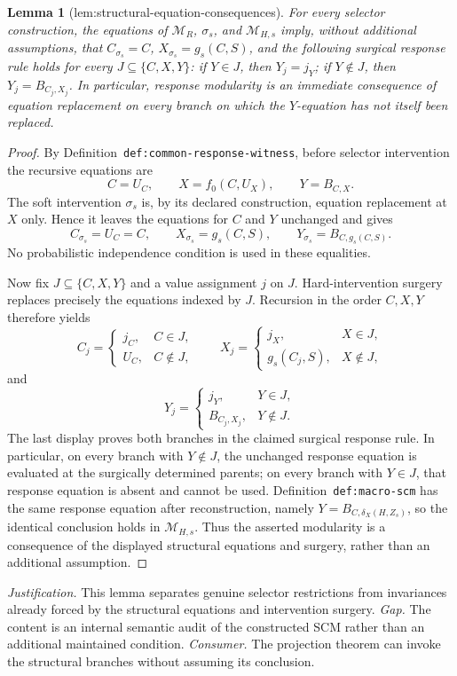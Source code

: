 \documentclass{article}
\newtheorem{lemma}{Lemma}
\begin{document}
\begin{lemma}[lem:structural-equation-consequences]\label{lem:structural-equation-consequences}
For every selector construction, the equations of \(\mathcal M_R\), \(\sigma_s\), and \(\mathcal M_{H,s}\) imply, without additional assumptions, that \(C_{\sigma_s}=C\), \(X_{\sigma_s}=g_s(C,S)\), and the following surgical response rule holds for every \(J\subseteq\{C,X,Y\}\): if \(Y\in J\), then \(Y_j=j_Y\); if \(Y\notin J\), then \(Y_j=B_{C_j,X_j}\). In particular, response modularity is an immediate consequence of equation replacement on every branch on which the \(Y\)-equation has not itself been replaced.
\end{lemma}
\begin{proof}
By Definition~\texttt{def:common-response-witness}, before selector intervention the recursive equations are
\[
C=U_C,\qquad X=f_0(C,U_X),\qquad Y=B_{C,X}.
\]
The soft intervention \(\sigma_s\) is, by its declared construction, equation replacement at \(X\) only.  Hence it leaves the equations for \(C\) and \(Y\) unchanged and gives
\[
C_{\sigma_s}=U_C=C,\qquad X_{\sigma_s}=g_s(C,S),\qquad
Y_{\sigma_s}=B_{C,g_s(C,S)}.
\]
No probabilistic independence condition is used in these equalities.

Now fix \(J\subseteq\{C,X,Y\}\) and a value assignment \(j\) on \(J\).  Hard-intervention surgery replaces precisely the equations indexed by \(J\).  Recursion in the order \(C,X,Y\) therefore yields
\[
C_j=\begin{cases}j_C,&C\in J,\\ U_C,&C\notin J,\end{cases}
\qquad
X_j=\begin{cases}j_X,&X\in J,\\ g_s(C_j,S),&X\notin J,\end{cases}
\]
and
\[
Y_j=\begin{cases}j_Y,&Y\in J,\\ B_{C_j,X_j},&Y\notin J.\end{cases}
\]
The last display proves both branches in the claimed surgical response rule.  In particular, on every branch with \(Y\notin J\), the unchanged response equation is evaluated at the surgically determined parents; on every branch with \(Y\in J\), that response equation is absent and cannot be used.  Definition~\texttt{def:macro-scm} has the same response equation after reconstruction, namely \(Y=B_{C,\delta_X(H,Z_s)}\), so the identical conclusion holds in \(\mathcal M_{H,s}\).  Thus the asserted modularity is a consequence of the displayed structural equations and surgery, rather than an additional assumption.
\end{proof}
\par\smallskip\noindent \textit{Justification.} This lemma separates genuine selector restrictions from invariances already forced by the structural equations and intervention surgery. \textit{Gap.} The content is an internal semantic audit of the constructed SCM rather than an additional maintained condition. \textit{Consumer.} The projection theorem can invoke the structural branches without assuming its conclusion.
\end{document}
